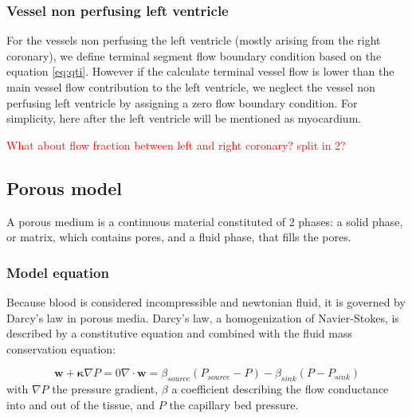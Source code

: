 \documentclass[journal]{IEEEtran}
\newcommand{\clcg}[1]{\textcolor{red}{#1}}
\begin{document}
%
%

\subsubsection{Vessel non perfusing left ventricle}
For the vessels non perfusing the left ventricle (mostly arising from the right coronary), we define terminal segment flow boundary condition based on the equation \ref{eq:qti}. However if the calculate terminal vessel flow is lower than the main vessel flow contribution to the left ventricle, we neglect the vessel non perfusing left ventricle by assigning a zero flow boundary condition.
For simplicity, here after the left ventricle will be mentioned as myocardium.

\clcg{What about flow fraction between left and right coronary? split in 2?}

\subsection{Porous model}
A porous medium is a continuous material constituted of 2 phases: a solid phase, or matrix, which contains pores, and a fluid phase, that fills the pores.
\subsubsection{Model equation}
Because blood is considered incompressible and newtonian fluid, it is governed by Darcy's law in porous media. 
Darcy's law, a homogenization of Navier-Stokes, is described by a constitutive equation and combined with the fluid mass conservation equation:

\begin{subequations}
\begin{equation}\label{eq:constiDarcy}
\bm{w} + \bm{\kappa} \nabla P = 0
\end{equation}
\begin{equation}\label{eq:conservDarcy}
\nabla \cdot \bm{w} = \beta_{source} \left(P_{source} - P\right) - \beta_{sink} \left(P - P_{sink}\right)
\end{equation}
\end{subequations}
with $\nabla P$ the pressure gradient, $\beta$ a coefficient describing the flow conductance into and out of the tissue, and $P$ the capillary bed pressure. 
\end{document}
